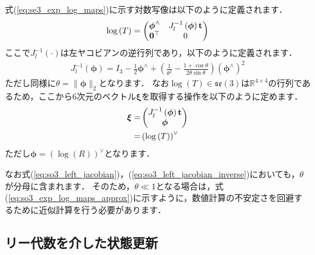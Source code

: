 式(\ref{eq:se3_exp_log_maps})に示す対数写像は以下のように定義されます．
%
\begin{align}
  \log \left( T \right) = \left( \begin{matrix}
    \boldsymbol \phi^{\wedge} & J_{l}^{-1} \left( \boldsymbol \phi \right) {\bf t} \\
    {\bf 0}^{\top}            & 0
  \end{matrix} \right)
  \label{eq:se3_log_map}
\end{align}
%
ここで$J_{l}^{-1} \left( \cdot \right)$は左ヤコビアンの逆行列であり，以下のように定義されます．
%
\begin{align}
  J_{l}^{-1} \left( \boldsymbol \phi \right)
  =
  I_{3} -
  \frac{1}{2} \boldsymbol \phi^{\wedge} + 
  \left( \frac{1}{ \theta^{2} } - \frac{ 1 + \cos \theta }{ 2 \theta \sin \theta } \right) \left( \boldsymbol \phi^{\wedge} \right)^{2}
  \label{eq:so3_left_jacobian_inverse}
\end{align}
%
ただし同様に$\theta = \| \boldsymbol \phi \|_{2}$となります．
なお$\log \left( T \right) \in \mathfrak{se}(3)$は$\mathbb{R}^{4 \times 4}$の行列であるため，ここから6次元のベクトル$\boldsymbol \xi$を取得する操作を以下のように定めます．
%
\begin{align}
  \begin{split}
    \boldsymbol \xi
%
    = & \left( \begin{matrix}
      J_{l}^{-1} \left( \boldsymbol \phi \right) {\bf t} \\
      \boldsymbol \phi
    \end{matrix} \right) \\
%
    = & \left( \log \left( T \right) \right)^{\vee}
  \end{split}
\end{align}
%
ただし$\boldsymbol \phi = \left( \log \left( R \right) \right)^{\vee}$となります．

なお式(\ref{eq:so3_left_jacobian})，(\ref{eq:so3_left_jacobian_inverse})においても，$\theta$が分母に含まれます．
そのため，$\theta \ll 1$となる場合は，式(\ref{eq:so3_exp_log_maps_approx})に示すように，数値計算の不安定さを回避するために近似計算を行う必要があります．











\subsection{リー代数を介した状態更新}

